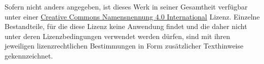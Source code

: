 \small  Sofern nicht anders angegeben, ist dieses Werk in seiner Gesamtheit verfügbar unter einer \href{https://creativecommons.org/licenses/by/4.0/}{\foreignlanguage{english}{Creative Commons} Namensnennung 4.0 International} Lizenz. %
Einzelne Bestandteile, für die diese Lizenz keine Anwendung findet und die daher nicht unter deren Lizenzbedingungen verwendet werden dürfen, sind mit ihren jeweiligen lizenzrechtlichen Bestimmungen in Form zusätzlicher Texthinweise gekennzeichnet. 
